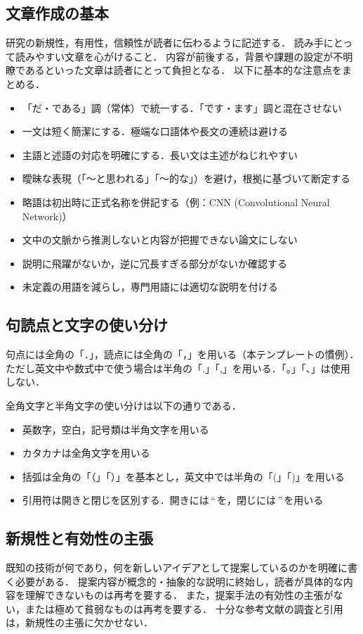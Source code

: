 \subsection{文章作成の基本}
\label{subsec:writing-tips}
研究の新規性，有用性，信頼性が読者に伝わるように記述する\cite{kisaragi}．
読み手にとって読みやすい文章を心がけること．
内容が前後する，背景や課題の設定が不明瞭であるといった文章は読者にとって負担となる．
以下に基本的な注意点をまとめる．
\begin{itemize}
    \item 「だ・である」調（常体）で統一する．「です・ます」調と混在させない
    \item 一文は短く簡潔にする．極端な口語体や長文の連続は避ける
    \item 主語と述語の対応を明確にする．長い文は主述がねじれやすい
    \item 曖昧な表現（「〜と思われる」「〜的な」）を避け，根拠に基づいて断定する
    \item 略語は初出時に正式名称を併記する（例：CNN (Convolutional Neural Network)）
    \item 文中の文脈から推測しないと内容が把握できない論文にしない
    \item 説明に飛躍がないか，逆に冗長すぎる部分がないか確認する
    \item 未定義の用語を減らし，専門用語には適切な説明を付ける
\end{itemize}

\subsection{句読点と文字の使い分け}
\label{subsec:punctuation}
句点には全角の「．」，読点には全角の「，」を用いる（本テンプレートの慣例）．
ただし英文中や数式中で使う場合は半角の「.」「,」を用いる．「。」「、」は使用しない．

全角文字と半角文字の使い分けは以下の通りである．
\begin{itemize}
    \item 英数字，空白，記号類は半角文字を用いる
    \item カタカナは全角文字を用いる
    \item 括弧は全角の「（」「）」を基本とし，英文中では半角の「(」「)」を用いる
    \item 引用符は開きと閉じを区別する．開きには\,``\,を，閉じには\,''\,を用いる
\end{itemize}

\subsection{新規性と有効性の主張}
\label{subsec:novelty}
既知の技術が何であり，何を新しいアイデアとして提案しているのかを明確に書く必要がある．
提案内容が概念的・抽象的な説明に終始し，読者が具体的な内容を理解できないものは再考を要する．
また，提案手法の有効性の主張がない，または極めて貧弱なものは再考を要する．
十分な参考文献の調査と引用は，新規性の主張に欠かせない．

